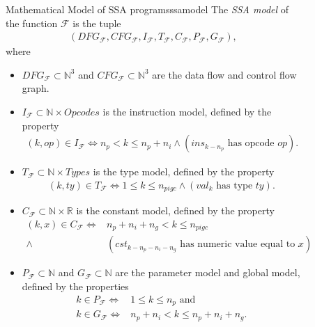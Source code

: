 \begin{figure}[p]
\begin{definition}{Mathematical Model of SSA programs}{ssamodel}
    The {\em SSA model} of the function $\mathcal F$ is the tuple
    \begin{align*}
        (DFG_\mathcal{F},
         CFG_\mathcal{F},
         I_\mathcal{F},
         T_\mathcal{F},
         C_\mathcal{F},
         P_\mathcal{F},
         G_\mathcal{F}),
    \end{align*}
    where

    \begin{itemize}
    \item $DFG_\mathcal{F}\subset\mathbb N^3$ and
          $CFG_\mathcal{F}\subset\mathbb N^3$ are the data flow and control
          flow graph.
    \item $I_\mathcal F\subset\mathbb N\times Opcodes$ is the instruction model,
          defined by the property
          \begin{align*}
              (k,op)\in I_\mathcal F\iff n_p<k\leq n_p+n_i
                  \mathrel{\land}(ins_{k-n_p}\text{ has opcode }op).
          \end{align*}
    \item $T_\mathcal F\subset\mathbb N\times Types$ is the type model, defined
          by the property
          \begin{align*}
              (k,ty)\in T_\mathcal F\iff 1\leq k\leq n_{pigc}
                  \mathrel{\land}(val_k\text{ has type }ty).
          \end{align*}
    \item $C_\mathcal F\subset\mathbb N\times\mathbb R$ is the constant model,
          defined by the property
          \begin{align*}
              (k,x)\in C_\mathcal F\iff{}&n_p+n_i+n_g<k\leq n_{pigc}\\
                        \mathrel{\land}{}&(cst_{k-n_p-n_i-n_g}
                        \text{ has numeric value equal to }x).
          \end{align*}
    \item $P_\mathcal F\subset\mathbb N$ and $G_\mathcal F\subset\mathbb N$
          are the parameter model and global model, defined by the properties
          \begin{align*}
              k\in P_\mathcal F\iff& 1\leq k\leq n_p\text{ and}\\
              k\in G_\mathcal F\iff& n_p+n_i<k\leq n_p+n_i+n_g.
          \end{align*}
    \end{itemize}
\end{definition}


\end{figure}
